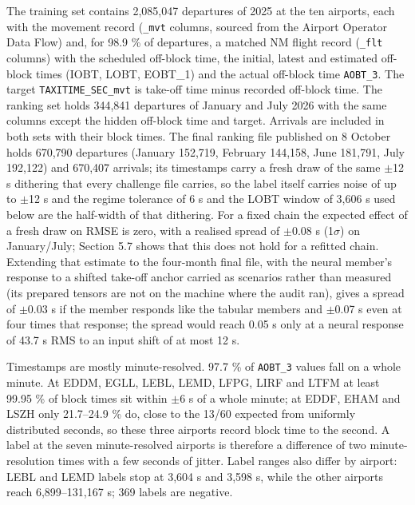 \documentclass[11pt,a4paper]{article}
\begin{document}
The training set contains 2,085,047 departures of 2025 at the ten airports, each with the movement record (\texttt{\_\allowbreak{}mvt} columns, sourced from the Airport Operator Data Flow) and, for 98.9 \% of departures, a matched NM flight record (\texttt{\_\allowbreak{}flt} columns) with the scheduled off-block time, the initial, latest and estimated off-block times (IOBT, LOBT, EOBT\_1) and the actual off-block time \texttt{AOBT\_\allowbreak{}3}. The target \texttt{TAXITIME\_\allowbreak{}SEC\_\allowbreak{}mvt} is take-off time minus recorded off-block time. The ranking set holds 344,841 departures of January and July 2026 with the same columns except the hidden off-block time and target. Arrivals are included in both sets with their block times. The final ranking file published on 8 October holds 670,790 departures (January 152,719, February 144,158, June 181,791, July 192,122) and 670,407 arrivals; its timestamps carry a fresh draw of the same $\pm$12 s dithering that every challenge file carries, so the label itself carries noise of up to $\pm$12 s and the regime tolerance of 6 s and the LOBT window of 3,606 s used below are the half-width of that dithering. For a fixed chain the expected effect of a fresh draw on RMSE is zero, with a realised spread of $\pm$0.08 s (1$\sigma$) on January/July; Section 5.7 shows that this does not hold for a refitted chain. Extending that estimate to the four-month final file, with the neural member's response to a shifted take-off anchor carried as scenarios rather than measured (its prepared tensors are not on the machine where the audit ran), gives a spread of $\pm$0.03 s if the member responds like the tabular members and $\pm$0.07 s even at four times that response; the spread would reach 0.05 s only at a neural response of 43.7 s RMS to an input shift of at most 12 s.

Timestamps are mostly minute-resolved. 97.7 \% of \texttt{AOBT\_\allowbreak{}3} values fall on a whole minute. At EDDM, EGLL, LEBL, LEMD, LFPG, LIRF and LTFM at least 99.95 \% of block times sit within $\pm$6 s of a whole minute; at EDDF, EHAM and LSZH only 21.7--24.9 \% do, close to the 13/60 expected from uniformly distributed seconds, so these three airports record block time to the second. A label at the seven minute-resolved airports is therefore a difference of two minute-resolution times with a few seconds of jitter. Label ranges also differ by airport: LEBL and LEMD labels stop at 3,604 s and 3,598 s, while the other airports reach 6,899--131,167 s; 369 labels are negative.
\end{document}
